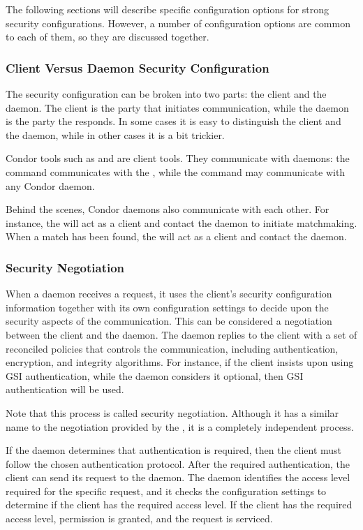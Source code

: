 The following sections will describe specific configuration options
for strong security configurations. However, a number of configuration
options are common to each of them, so they are discussed together.

\subsubsection{\label{sec:client-vs-daemon}Client Versus Daemon
Security Configuration}
The security configuration can be broken into two parts: the client
and the daemon. The client is the party that initiates communication,
while the daemon is the party the responds. In some cases it is easy
to distinguish the client and the daemon, while in other cases it is a
bit trickier. 

Condor tools such as  and  are
client tools. They communicate with daemons: the 
command communicates with the , while the
 command may communicate with any Condor daemon. 

Behind the scenes, Condor daemons also communicate with each
other. For instance, the  will act as a client and
contact the  daemon to initiate matchmaking. When a
match has been found, the  will act as a client and
contact the  daemon. 

\subsubsection{\label{sec:security-negotiation} Security Negotiation}

When a daemon receives a request, it uses the client's security
configuration information together with its own configuration settings
to decide upon the security aspects of the communication.  This can be
considered a negotiation between the client and the daemon.  The
daemon replies to the client with a set of reconciled policies that
controls the communication, including authentication, encryption, and
integrity algorithms. For instance, if the client insists upon using
GSI authentication, while the daemon considers it optional, then GSI
authentication will be used. 

Note that this process is called security negotiation. Although it has
a similar name to the negotiation provided by the ,
it is a completely independent process.

If the daemon determines that authentication is required, then the
client must follow the chosen authentication protocol.  After the
required authentication, the client can send its request to the
daemon.  The daemon identifies the access level required for the
specific request, and it checks the configuration settings to
determine if the client has the required access level.  If the client
has the required access level, permission is granted, and the request
is serviced.


